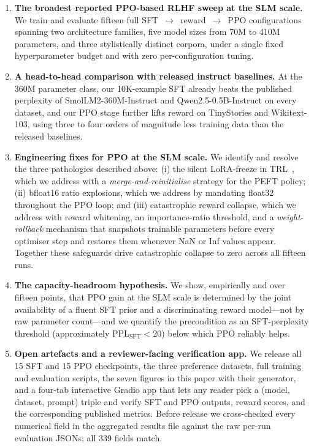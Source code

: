 \documentclass[10pt,twocolumn,letterpaper]{article}
\begin{document}
\begin{enumerate}[leftmargin=*, topsep=2pt, itemsep=2pt]
  \item \textbf{The broadest reported PPO-based RLHF sweep at the SLM scale.} We train and evaluate fifteen full SFT~$\to$~reward~$\to$~PPO configurations spanning two architecture families, five model sizes from 70M to 410M parameters, and three stylistically distinct corpora, under a single fixed hyperparameter budget and with zero per-configuration tuning.

  \item \textbf{A head-to-head comparison with released instruct baselines.} At the 360M parameter class, our 10K-example SFT already beats the published perplexity of SmolLM2-360M-Instruct and Qwen2.5-0.5B-Instruct on every dataset, and our PPO stage further lifts reward on TinyStories and Wikitext-103, using three to four orders of magnitude less training data than the released baselines.

  \item \textbf{Engineering fixes for PPO at the SLM scale.} We identify and resolve the three pathologies described above: (i) the silent LoRA-freeze in TRL~\cite{vonwerra2022trl}, which we address with a \emph{merge-and-reinitialise} strategy for the PEFT policy; (ii) bfloat16 ratio explosions, which we address by mandating float32 throughout the PPO loop; and (iii) catastrophic reward collapse, which we address with reward whitening, an importance-ratio threshold, and a \emph{weight-rollback} mechanism that snapshots trainable parameters before every optimiser step and restores them whenever NaN or Inf values appear. Together these safeguards drive catastrophic collapse to zero across all fifteen runs.

  \item \textbf{The capacity-headroom hypothesis.} We show, empirically and over fifteen points, that PPO gain at the SLM scale is determined by the joint availability of a fluent SFT prior and a discriminating reward model---not by raw parameter count---and we quantify the precondition as an SFT-perplexity threshold (approximately $\text{PPL}_{\text{SFT}}<20$) below which PPO reliably helps.

  \item \textbf{Open artefacts and a reviewer-facing verification app.} We release all 15 SFT and 15 PPO checkpoints, the three preference datasets, full training and evaluation scripts, the seven figures in this paper with their generator, and a four-tab interactive Gradio app that lets any reader pick a (model, dataset, prompt) triple and verify SFT and PPO outputs, reward scores, and the corresponding published metrics. Before release we cross-checked every numerical field in the aggregated results file against the raw per-run evaluation JSONs; all 339 fields match.
\end{enumerate}
\end{document}
